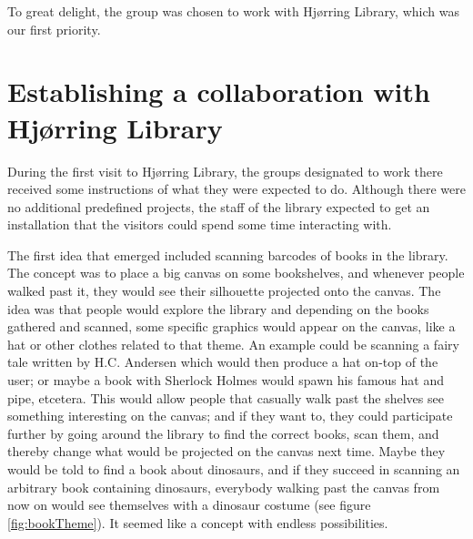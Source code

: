 To great delight, the group was chosen to work with Hj{\o}rring Library, which was our first priority.

\section{Establishing a collaboration with Hj{\o}rring Library}


During the first visit to Hj{\o}rring Library, the groups designated to work there received some instructions of what they were expected to do. Although there were no additional predefined projects, the staff of the library expected to get an installation that the visitors could spend some time interacting with.

The first idea that emerged included scanning barcodes of books in the library. The concept was to place a big canvas on some bookshelves, and whenever people walked past it, they would see their silhouette projected onto the canvas. The idea was that people would explore the library and depending on the books gathered and scanned, some specific graphics would appear on the canvas, like a hat or other clothes related to that theme. An example could be scanning a fairy tale written by H.C. Andersen which would then produce a hat on-top of the user; or maybe a book with Sherlock Holmes would spawn his famous hat and pipe, etcetera. This would allow people that casually walk past the shelves see something interesting on the canvas; and if they want to, they could participate further by going around the library to find the correct books, scan them, and thereby change what would be projected on the canvas next time. Maybe they would be told to find a book about dinosaurs, and if they succeed in scanning an arbitrary book containing dinosaurs, everybody walking past the canvas from now on would see themselves with a dinosaur costume (see figure \ref{fig:bookTheme}). It seemed like a concept with endless possibilities.

